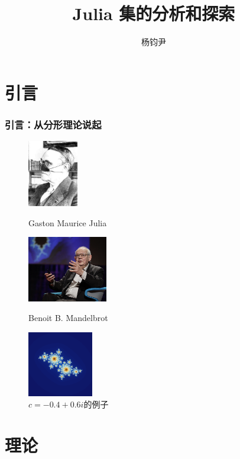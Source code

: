 \documentclass[11pt,c,compress,UTF8]{ctexbeamer}
\title{Julia 集的分析和探索}
\author{杨钧尹}
\institute{浙江大学 数学科学学院}
\begin{document}
\thispagestyle{empty}   %
\maketitle

\section{引言}

\begin{frame}
\frametitle{引言：从分形理论说起} 
\begin{figure}[htbp]
\centering
\begin{minipage}{0.3\linewidth}
\centering
\includegraphics[width = 2.2cm]{./images/julia.jpg}
\caption{\small Gaston Maurice Julia}
\end{minipage}\hfill
\begin{minipage}{0.3\linewidth}
\centering
\includegraphics[width = 3.5cm]{./images/mandelbort.png}
\caption{\small Benoit B. Mandelbrot}
\end{minipage}\hfill
\begin{minipage}{0.35\linewidth}
\centering
\includegraphics[width = 2.85cm]{./images/julia_set_example.png}
\caption{\small $c=−0.4+0.6i$的例子}
\end{minipage}
\end{figure}
\end{frame}

\section{理论}
\end{document}
